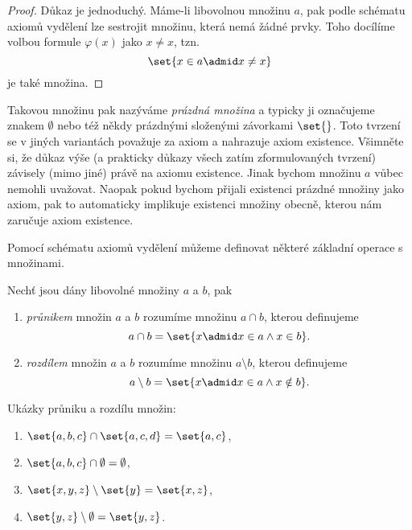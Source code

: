 \begin{proof}
    Důkaz je jednoduchý. Máme-li libovolnou množinu $a$, pak podle schématu axiomů vydělení lze sestrojit množinu, která nemá žádné prvky. Toho docílíme volbou formule $\varphi(x)$ jako $x\neq x$, tzn.
    \begin{equation*}
        \set{x\in a \admid x\neq x}
    \end{equation*}
    je také množina.
\end{proof}
Takovou množinu pak nazýváme \emph{prázdná množina} a typicky ji označujeme znakem $\emptyset$ nebo též někdy prázdnými složenými závorkami $\set{}$. Toto tvrzení se v jiných variantách \ZF{} považuje za axiom a nahrazuje axiom existence. Všimněte si, že důkaz výše (a prakticky důkazy všech zatím zformulovaných tvrzení) závisely (mimo jiné) právě na axiomu existence. Jinak bychom množinu $a$ vůbec nemohli uvažovat. Naopak pokud bychom přijali existenci prázdné množiny jako axiom, pak to automaticky implikuje existenci množiny obecně, kterou nám zaručuje axiom existence.\par
Pomocí schématu axiomů vydělení můžeme definovat některé základní operace s množinami.
\begin{definition}\label{def:prunik_rozdil}
    Nechť jsou dány libovolné množiny $a$ a $b$, pak
    \begin{enumerate}[label=(\roman*)]
        \item \emph{průnikem} množin $a$ a $b$ rozumíme množinu $a \cap b$, kterou definujeme
        \begin{equation*}
            a\cap b=\set{x \admid x\in a \land x\in b}.
        \end{equation*}
        \item \emph{rozdílem} množin $a$ a $b$ rozumíme množinu $a \setminus b$, kterou definujeme
        \begin{equation*}
            a\setminus b=\set{x \admid x\in a \land x\notin b}.
        \end{equation*}
    \end{enumerate}
\end{definition}
\begin{example}
    Ukázky průniku a rozdílu množin:
    \begin{enumerate}[label=(\roman*)]
        \item $\set{a,b,c}\cap\set{a,c,d}=\set{a,c}$,
        \item $\set{a,b,c}\cap\emptyset=\emptyset$,
        \item $\set{x,y,z}\setminus\set{y}=\set{x,z}$,
        \item $\set{y,z}\setminus\emptyset=\set{y,z}$.
    \end{enumerate}
\end{example}
